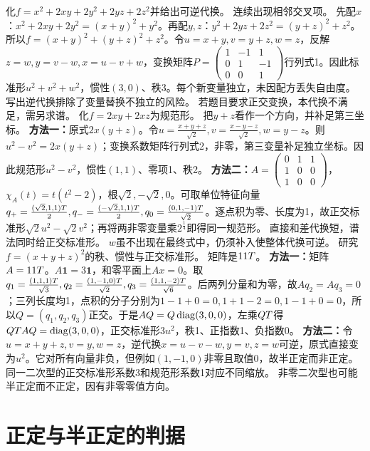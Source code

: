 {化$f=x^2+2xy+2y^2+2yz+2z^2$并给出可逆代换。}
{连续出现相邻交叉项。}
{先配$x$：$x^2+2xy+2y^2=(x+y)^2+y^2$。再配$y,z$：$y^2+2yz+2z^2=(y+z)^2+z^2$。所以$f=(x+y)^2+(y+z)^2+z^2$。令$u=x+y,v=y+z,w=z$，反解$z=w,y=v-w,x=u-v+w$，变换矩阵$P=\begin{pmatrix}1&-1&1\\0&1&-1\\0&0&1\end{pmatrix}$行列式1。因此标准形$u^2+v^2+w^2$，惯性$(3,0)$、秩3。每个新变量独立，未因配方丢失自由度。}
{写出逆代换排除了变量替换不独立的风险。}
{若题目要求正交变换，本代换不满足，需另求谱。}
{化$f=2xy+2xz$为规范形。}
{把$y+z$看作一个方向，并补足第三坐标。}
{\textbf{方法一：}原式$2x(y+z)$。令$u=\frac{x+y+z}{\sqrt2},v=\frac{x-y-z}{\sqrt2},w=y-z$。则$u^2-v^2=2x(y+z)$；变换系数矩阵行列式2，非零，第三变量补足独立坐标。因此规范形$u^2-v^2$，惯性$(1,1)$、零项1、秩2。
\textbf{方法二：}$A=\begin{pmatrix}0&1&1\\1&0&0\\1&0&0\end{pmatrix}$，$\chi_A(t)=t(t^2-2)$，根$\sqrt2,-\sqrt2,0$。可取单位特征向量$q_+=\frac{(\sqrt2,1,1)T}{2},q_-=\frac{(-\sqrt2,1,1)T}{2},q_0=\frac{(0,1,-1)T}{\sqrt2}$。逐点积为零、长度为1，故正交标准形$\sqrt2u^2-\sqrt2v^2$；再将两非零变量乘$2^{\frac{1}{4}}$即得同一规范形。}
{直接和差代换短，谱法同时给正交标准形。}
{$w$虽不出现在最终式中，仍须补入使整体代换可逆。}
{研究$f=(x+y+z)^2$的秩、惯性与正交标准形。}
{矩阵是$11T$。}
{\textbf{方法一：}矩阵$A=11T$。$A\bm1=3\bm1$，和零平面上$Ax=0$。取$q_1=\frac{(1,1,1)T}{\sqrt3},q_2=\frac{(1,-1,0)T}{\sqrt2},q_3=\frac{(1,1,-2)T}{\sqrt6}$。后两列分量和为零，故$Aq_2=Aq_3=0$；三列长度均1，点积的分子分别为$1-1+0=0,1+1-2=0,1-1+0=0$，所以$Q=(q_1,q_2,q_3)$正交。于是$AQ=Q\operatorname{diag}(3,0,0)$，左乘$QT$得$QT AQ=\operatorname{diag}(3,0,0)$，正交标准形$3u^2$，秩1、正指数1、负指数0。
\textbf{方法二：}令$u=x+y+z,v=y,w=z$，逆代换$x=u-v-w,y=v,z=w$可逆，原式直接变为$u^2$。它对所有向量非负，但例如$(1,-1,0)$非零且取值0，故半正定而非正定。}
{同一二次型的正交标准形系数3和规范形系数1对应不同缩放。}
{非零二次型也可能半正定而不正定，因有非零零值方向。}


\section{正定与半正定的判据}
